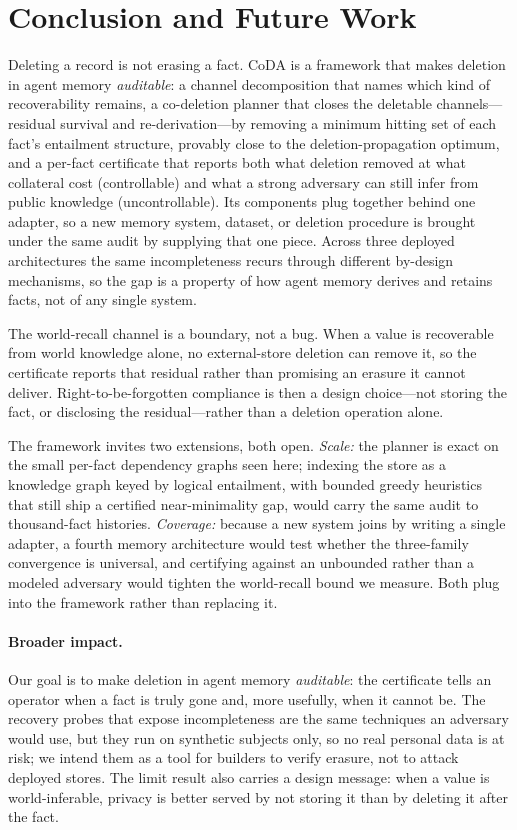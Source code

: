 \documentclass[letterpaper]{article}
\begin{document}
\section{Conclusion and Future Work}\label{sec:conclusion}

Deleting a record is not erasing a fact. CoDA is a framework that makes deletion in agent
memory \emph{auditable}: a channel decomposition that names which kind of recoverability
remains, a co-deletion planner that closes the deletable channels---residual survival and
re-derivation---by removing a minimum hitting set of each fact's entailment structure,
provably close to the deletion-propagation optimum, and a per-fact certificate that reports
both what deletion removed at what collateral cost (controllable) and what a strong
adversary can still infer from public knowledge (uncontrollable). Its components plug
together behind one adapter, so a new memory system, dataset, or deletion procedure is
brought under the same audit by supplying that one piece. Across three deployed architectures the same
incompleteness recurs through different by-design mechanisms, so the gap is a property of
how agent memory derives and retains facts, not of any single system.

The world-recall channel is a boundary, not a bug. When a value is recoverable from
world knowledge alone, no external-store deletion can remove it, so the certificate
reports that residual rather than promising an erasure it cannot deliver.
Right-to-be-forgotten compliance is then a design choice---not storing the fact, or
disclosing the residual---rather than a deletion operation alone.

The framework invites two extensions, both open. \emph{Scale:} the planner is exact on the
small per-fact dependency graphs seen here; indexing the store as a knowledge graph keyed by
logical entailment, with bounded greedy heuristics that still ship a certified
near-minimality gap, would carry the same audit to thousand-fact histories.
\emph{Coverage:} because a new system joins by writing a single adapter, a fourth memory
architecture would test whether the three-family convergence is universal, and certifying
against an unbounded rather than a modeled adversary would tighten the world-recall bound we
measure. Both plug into the framework rather than replacing it.

\paragraph{Broader impact.} Our goal is to make deletion in agent memory
\emph{auditable}: the certificate tells an operator when a fact is truly gone and, more
usefully, when it cannot be. The recovery probes that expose incompleteness are the
same techniques an adversary would use, but they run on synthetic subjects only, so no
real personal data is at risk; we intend them as a tool for builders to verify erasure,
not to attack deployed stores. The limit result also carries a design message: when a
value is world-inferable, privacy is better served by not storing it than by deleting
it after the fact.
\end{document}
